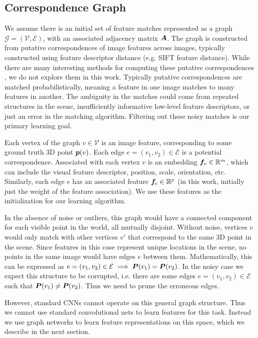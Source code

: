 \documentclass{article} %
\begin{document}
\subsection{Correspondence Graph}
We assume there is an initial set of feature matches represented as a graph $\mathcal{G} = (\mathcal{V}, \mathcal{E})$, with an associated adjacency matrix ${\bm{A}}$.
The graph is constructed from putative correspondences of image features across images, typically constructed using feature descriptor distance (e.g. SIFT feature distance).
While there are many interesting methods for computing these putative correspondences \cite{suh2015subgraph, yi2018learning}, we do not explore them in this work.
Typically putative correspondences are matched probabilistically, meaning a feature in one image matches to many features in another.
The ambiguity in the matches could come from repeated structures in the scene, insufficiently informative low-level feature descriptors, or just an error in the matching algorithm.
Filtering out these noisy matches is our primary learning goal.

Each vertex of the graph $v \in \mathcal{V}$ is an image feature, corresponding to some ground truth 3D point ${\bm{p}}(v)$.
Each edge $e = (v_1, v_2) \in \mathcal{E}$ is a potential correspondence.
Associated with each vertex $v$ is an embedding ${\bm{f}}_v \in {\mathbb{R}}^m$, which can include the visual feature descriptor, position, scale, orientation, etc.
Similarly, each edge $e$ has an associated feature ${\bm{f}}_e \in {\mathbb{R}}^p$ (in this work, initially just the weight of the feature association).
We use these features as the initialization for our learning algorithm.

In the absence of noise or outliers, this graph would have a connected component for each visible point in the world, all mutually disjoint.
Without noise, vertices $v$ would only match with other vertices $v'$ that correspond to the same 3D point in the scene.
Since features in this case represent unique locations in the scene, no points in the same image would have edges $e$ between them.
Mathematically, this can be expressed as $e = (v_1, v_2) \in \mathcal{E} \implies {\bm{P}}(v_1) = {\bm{P}}(v_2)$.
In the noisy case we expect this structure to be corrupted, i.e. there are some edges $e = (v_1, v_2) \in \mathcal{E}$ such that ${\bm{P}}(v_1) \neq {\bm{P}}(v_2)$.
Thus we need to prune the erroneous edges.

However, standard CNNs cannot operate on this general graph structure.
Thus we cannot use standard convolutional nets to learn features for this task.
Instead we use graph networks to learn feature representations on this space, which we describe in the next section.
\end{document}

